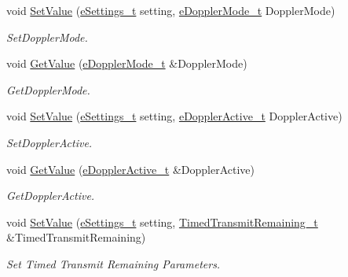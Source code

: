 \begin{DoxyCompactItemize}
void \mbox{\hyperlink{struct_quantum_lib_1_1_setting_data__t_ad6abb3dbfcd6f8bc5cb33ef75f8b2656}{Set\+Value}} (\mbox{\hyperlink{namespace_quantum_lib_acc8124e3e65bca4aa798d03a55e3d54c}{e\+Settings\+\_\+t}} setting, \mbox{\hyperlink{namespace_quantum_lib_a67a865bb9894671b27595a61dfcd44b5}{e\+Doppler\+Mode\+\_\+t}} Doppler\+Mode)
\begin{DoxyCompactList}\small\item\em Set\+Doppler\+Mode. \end{DoxyCompactList}\item 
void \mbox{\hyperlink{struct_quantum_lib_1_1_setting_data__t_a40d5020934023e7f8f9734390b37d5b4}{Get\+Value}} (\mbox{\hyperlink{namespace_quantum_lib_a67a865bb9894671b27595a61dfcd44b5}{e\+Doppler\+Mode\+\_\+t}} \&Doppler\+Mode)
\begin{DoxyCompactList}\small\item\em Get\+Doppler\+Mode. \end{DoxyCompactList}\item 
void \mbox{\hyperlink{struct_quantum_lib_1_1_setting_data__t_ad515aac063176db62a229cc907c94b7b}{Set\+Value}} (\mbox{\hyperlink{namespace_quantum_lib_acc8124e3e65bca4aa798d03a55e3d54c}{e\+Settings\+\_\+t}} setting, \mbox{\hyperlink{namespace_quantum_lib_a7a034f49c93f16195096c2ecf89432d4}{e\+Doppler\+Active\+\_\+t}} Doppler\+Active)
\begin{DoxyCompactList}\small\item\em Set\+Doppler\+Active. \end{DoxyCompactList}\item 
void \mbox{\hyperlink{struct_quantum_lib_1_1_setting_data__t_ae20b64e4c5d1cc5696f09ba8eedc3eaa}{Get\+Value}} (\mbox{\hyperlink{namespace_quantum_lib_a7a034f49c93f16195096c2ecf89432d4}{e\+Doppler\+Active\+\_\+t}} \&Doppler\+Active)
\begin{DoxyCompactList}\small\item\em Get\+Doppler\+Active. \end{DoxyCompactList}\item 
void \mbox{\hyperlink{struct_quantum_lib_1_1_setting_data__t_a7591b7ec9a3de4b08d00ffa60571f3c7}{Set\+Value}} (\mbox{\hyperlink{namespace_quantum_lib_acc8124e3e65bca4aa798d03a55e3d54c}{e\+Settings\+\_\+t}} setting, \mbox{\hyperlink{struct_quantum_lib_1_1_timed_transmit_remaining__t}{Timed\+Transmit\+Remaining\+\_\+t}} \&Timed\+Transmit\+Remaining)
\begin{DoxyCompactList}\small\item\em Set Timed Transmit Remaining Parameters. \end{DoxyCompactList}\item 

\end{DoxyCompactItemize}
